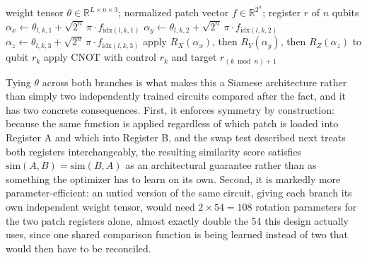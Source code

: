 \documentclass[conference]{IEEEtran}
\begin{document}
\begin{algorithm}[t]
\caption{Tied re-uploading block, applied once per register}
\label{alg:reupload}
\begin{algorithmic}[1]
\Require weight tensor $\theta\in\mathbb{R}^{L\times n\times3}$; normalized patch vector $f\in\mathbb{R}^{2^n}$; register $r$ of $n$ qubits
    \State $\alpha_x \gets \theta_{l,k,1} + \sqrt{2^n}\,\pi\cdot f_{\mathrm{idx}(l,k,1)}$
    \State $\alpha_y \gets \theta_{l,k,2} + \sqrt{2^n}\,\pi\cdot f_{\mathrm{idx}(l,k,2)}$
    \State $\alpha_z \gets \theta_{l,k,3} + \sqrt{2^n}\,\pi\cdot f_{\mathrm{idx}(l,k,3)}$
    \State apply $R_X(\alpha_x)$, then $R_Y(\alpha_y)$, then $R_Z(\alpha_z)$ to qubit $r_k$
  \EndFor
    \State apply CNOT with control $r_k$ and target $r_{(k \bmod n)+1}$
  \EndFor
\EndFor
\end{algorithmic}
\end{algorithm}

Tying $\theta$ across both branches is what makes this a Siamese architecture rather than simply two independently trained circuits compared after the fact, and it has two concrete consequences. First, it enforces symmetry by construction: because the same function is applied regardless of which patch is loaded into Register A and which into Register B, and the swap test described next treats both registers interchangeably, the resulting similarity score satisfies $\mathrm{sim}(A,B) = \mathrm{sim}(B,A)$ as an architectural guarantee rather than as something the optimizer has to learn on its own. Second, it is markedly more parameter-efficient: an untied version of the same circuit, giving each branch its own independent weight tensor, would need $2\times54 = 108$ rotation parameters for the two patch registers alone, almost exactly double the 54 this design actually uses, since one shared comparison function is being learned instead of two that would then have to be reconciled.
\end{document}
